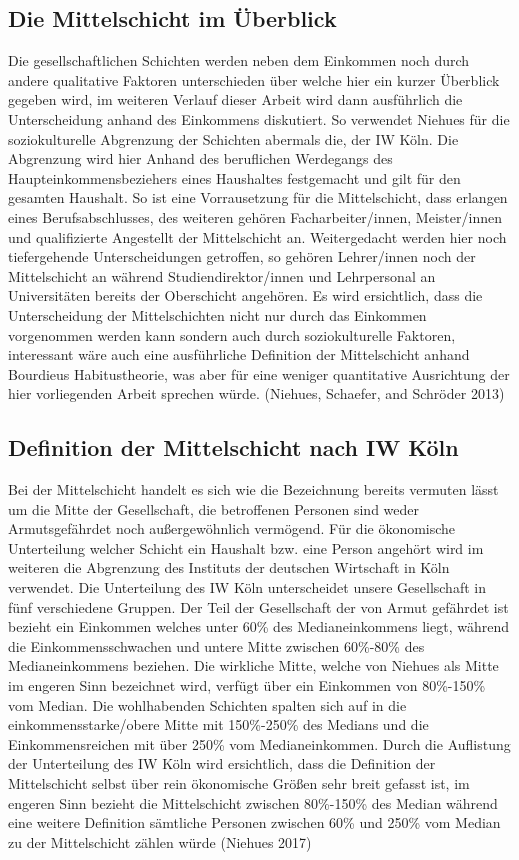 \documentclass[12pt,]{article}
\begin{document}
\subsection{Die Mittelschicht im
Überblick}\label{die-mittelschicht-im-uberblick}

Die gesellschaftlichen Schichten werden neben dem Einkommen noch durch
andere qualitative Faktoren unterschieden über welche hier ein kurzer
Überblick gegeben wird, im weiteren Verlauf dieser Arbeit wird dann
ausführlich die Unterscheidung anhand des Einkommens diskutiert. So
verwendet Niehues für die soziokulturelle Abgrenzung der Schichten
abermals die, der IW Köln. Die Abgrenzung wird hier Anhand des
beruflichen Werdegangs des Haupteinkommensbeziehers eines Haushaltes
festgemacht und gilt für den gesamten Haushalt. So ist eine
Vorrausetzung für die Mittelschicht, dass erlangen eines
Berufsabschlusses, des weiteren gehören Facharbeiter/innen,
Meister/innen und qualifizierte Angestellt der Mittelschicht an.
Weitergedacht werden hier noch tiefergehende Unterscheidungen getroffen,
so gehören Lehrer/innen noch der Mittelschicht an während
Studiendirektor/innen und Lehrpersonal an Universitäten bereits der
Oberschicht angehören. Es wird ersichtlich, dass die Unterscheidung der
Mittelschichten nicht nur durch das Einkommen vorgenommen werden kann
sondern auch durch soziokulturelle Faktoren, interessant wäre auch eine
ausführliche Definition der Mittelschicht anhand Bourdieus
Habitustheorie, was aber für eine weniger quantitative Ausrichtung der
hier vorliegenden Arbeit sprechen würde. (Niehues, Schaefer, and
Schröder 2013)

\subsection{Definition der Mittelschicht nach IW
Köln}\label{definition-der-mittelschicht-nach-iw-koln}

Bei der Mittelschicht handelt es sich wie die Bezeichnung bereits
vermuten lässt um die Mitte der Gesellschaft, die betroffenen Personen
sind weder Armutsgefährdet noch außergewöhnlich vermögend. Für die
ökonomische Unterteilung welcher Schicht ein Haushalt bzw. eine Person
angehört wird im weiteren die Abgrenzung des Instituts der deutschen
Wirtschaft in Köln verwendet. Die Unterteilung des IW Köln unterscheidet
unsere Gesellschaft in fünf verschiedene Gruppen. Der Teil der
Gesellschaft der von Armut gefährdet ist bezieht ein Einkommen welches
unter 60\% des Medianeinkommens liegt, während die Einkommensschwachen
und untere Mitte zwischen 60\%-80\% des Medianeinkommens beziehen. Die
wirkliche Mitte, welche von Niehues als Mitte im engeren Sinn bezeichnet
wird, verfügt über ein Einkommen von 80\%-150\% vom Median. Die
wohlhabenden Schichten spalten sich auf in die einkommensstarke/obere
Mitte mit 150\%-250\% des Medians und die Einkommensreichen mit über
250\% vom Medianeinkommen. Durch die Auflistung der Unterteilung des IW
Köln wird ersichtlich, dass die Definition der Mittelschicht selbst über
rein ökonomische Größen sehr breit gefasst ist, im engeren Sinn bezieht
die Mittelschicht zwischen 80\%-150\% des Median während eine weitere
Definition sämtliche Personen zwischen 60\% und 250\% vom Median zu der
Mittelschicht zählen würde (Niehues 2017)
\end{document}
